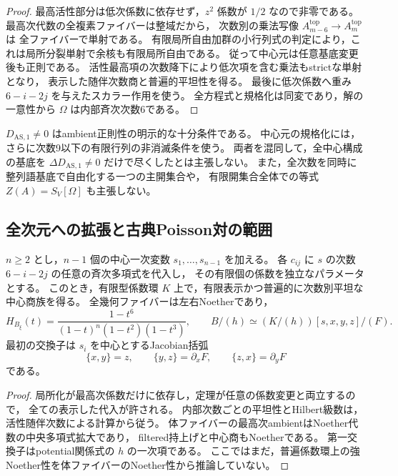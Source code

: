 \begin{proof}
最高活性部分は低次係数に依存せず，$z^2$ 係数が $1/2$ なので非零である。
最高次代数の全複素ファイバーは整域だから，
次数別の乗法写像 $A^{\mathrm{top}}_{m-6}\to A^{\mathrm{top}}_m$ は
全ファイバーで単射である。
有限局所自由加群の小行列式の判定により，これは局所分裂単射で余核も有限局所自由である。
従って中心元は任意基底変更後も正則である。
活性最高項の次数降下により低次項を含む乗法もstrictな単射となり，
表示した随伴次数商と普遍的平坦性を得る。
最後に低次係数へ重み $6-i-2j$ を与えたスカラー作用を使う。
全方程式と規格化は同変であり，解の一意性から $\Omega$ は内部斉次次数6である。
\end{proof}

\begin{remark}
$D_{\mathrm{AS},1}\ne0$ はambient正則性の明示的な十分条件である。
中心元の規格化には，さらに次数9以下の有限行列の非消滅条件を使う。
両者を混同して，全中心構成の基底を
$\Delta D_{\mathrm{AS},1}\ne0$ だけで尽くしたとは主張しない。
また，全次数を同時に整列語基底で自由化する一つの主開集合や，
有限開集合全体での等式 $Z(A)=S_V[\Omega]$ も主張しない。
\end{remark}

\subsection{全次元への拡張と古典Poisson対の範囲}

\begin{corollary}\label{cor:degree-one-elliptic-general-dimension}
$n\ge2$ とし，$n-1$ 個の中心一次変数 $s_1,\ldots,s_{n-1}$ を加える。
各 $c_{ij}$ に $s$ の次数 $6-i-2j$ の任意の斉次多項式を代入し，
その有限個の係数を独立なパラメータとする。
このとき，有限型係数環 $K$ 上で，有限表示かつ普遍的に次数別平坦な中心商族を得る。
全幾何ファイバーは左右Noetherであり，
\[
 H_{B_\xi}(t)=\frac{1-t^6}{(1-t)^n(1-t^2)(1-t^3)},\qquad
 B/(h)\simeq(K/(h))[s,x,y,z]/(F).
\]
最初の交換子は $s_i$ を中心とするJacobian括弧
\[
 \{x,y\}=z,\qquad \{y,z\}=\partial_xF,
 \qquad \{z,x\}=\partial_yF
\]
である。
\end{corollary}
\begin{proof}
局所化が最高次係数だけに依存し，定理が任意の係数変更と両立するので，
全ての表示した代入が許される。
内部次数ごとの平坦性とHilbert級数は，活性随伴次数による計算から従う。
体ファイバーの最高次ambientはNoether代数の中央多項式拡大であり，
filtered持上げと中心商もNoetherである。
第一交換子はpotential関係式の $h$ の一次項である。
ここではまだ，普遍係数環上の強Noether性を体ファイバーのNoether性から推論していない。
\end{proof}

